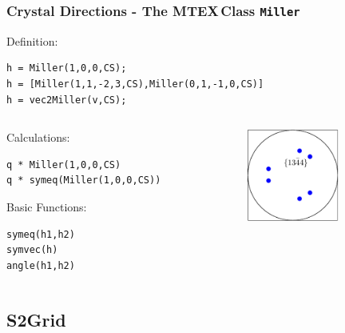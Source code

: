 \documentclass{beamer}
\newcommand{\MTEX}{{\bf {\color{red}M}TEX\,}}%
\begin{document}
\begin{frame}[fragile]
  \frametitle{Crystal Directions - The \MTEX Class \texttt{\bf Miller}}
  
  Definition:

\begin{lstlisting}
h = Miller(1,0,0,CS);
h = [Miller(1,1,-2,3,CS),Miller(0,1,-1,0,CS)]
h = vec2Miller(v,CS);
\end{lstlisting}

\medskip

\begin{columns}
  \begin{column}{8.5cm}

    Calculations:

\begin{lstlisting}
q * Miller(1,0,0,CS)
q * symeq(Miller(1,0,0,CS))
\end{lstlisting}

\medskip

    Basic Functions:

\begin{lstlisting}
symeq(h1,h2)
symvec(h)
angle(h1,h2)
\end{lstlisting}
  \end{column}
  
  \begin{column}{3cm}
    \includegraphics[width=3cm]{pic/miller}
  \end{column}

\end{columns}

\end{frame}

\subsection*{S2Grid}
\end{document}
